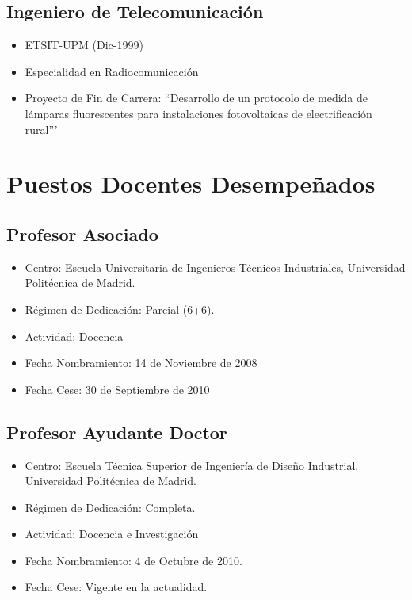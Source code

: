 \documentclass[article, a4paper]{memoir}
\begin{document}
\subsection{Ingeniero de Telecomunicación}
\label{sec-2-2}
\begin{itemize}
\item ETSIT-UPM (Dic-1999)
\item Especialidad en Radiocomunicación
\item Proyecto de Fin de Carrera: ``Desarrollo de un protocolo de medida de lámparas fluorescentes para instalaciones fotovoltaicas de electrificación rural'''
\end{itemize}


\section{Puestos Docentes Desempeñados}
\label{sec-3}

\subsection{Profesor Asociado}
\label{sec-3-1}
\begin{itemize}
\item Centro: Escuela Universitaria de Ingenieros Técnicos Industriales, Universidad Politécnica de Madrid.
\item Régimen de Dedicación: Parcial (6+6).
\item Actividad: Docencia
\item Fecha Nombramiento: 14 de Noviembre de 2008
\item Fecha Cese: 30 de Septiembre de 2010
\end{itemize}

\subsection{Profesor Ayudante Doctor}
\label{sec-3-2}
\begin{itemize}
\item Centro: Escuela Técnica Superior de Ingeniería de Diseño Industrial, Universidad Politécnica de Madrid.
\item Régimen de Dedicación: Completa.
\item Actividad: Docencia e Investigación
\item Fecha Nombramiento: 4 de Octubre de 2010.
\item Fecha Cese: Vigente en la actualidad.
\end{itemize}
\end{document}

